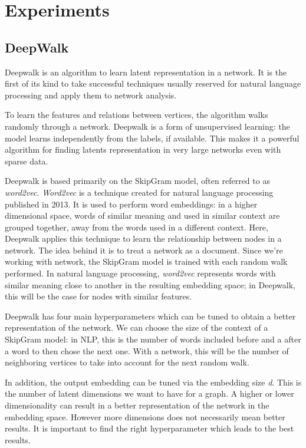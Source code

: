 
\chapter{Experiments} %
\label{cha:Experiments}

\section{DeepWalk}

Deepwalk is an algorithm to learn latent representation in a network.
It is the first of its kind to take successful techniques usually reserved for natural language processing and apply them to network analysis.

To learn the features and relations between vertices, the algorithm walks randomly through a network.
Deepwalk is a form of unsupervised learning: the model learns independently from the labels, if available.
This makes it a powerful algorithm for finding latents representation in very large networks even with sparse data.

Deepwalk is based primarily on the SkipGram model, often referred to as \textit{word2vec}. 
\textit{Word2vec} is a technique created for natural language processing published in 2013.
It is used to perform word embeddings: in a higher dimensional space, words of similar meaning and used in similar context are grouped together, away from the words used in a different context.
Here, Deepwalk applies this technique to learn the relationship between nodes in a network.
The idea behind it is to treat a network as a document.
Since we're working with network, the SkipGram model is trained with each random walk performed.
In natural language processing, \textit{word2vec} represents words with similar meaning close to another in the resulting embedding space; in Deepwalk, this will be the case for nodes with similar features.

Deepwalk has four main hyperparameters which can be tuned to obtain a better representation of the network.
We can choose the size of the context of a SkipGram model: in NLP, this is the number of words included before and a after a word to then chose the next one.
With a network, this will be the number of neighboring vertices to take into account for the next random walk.

In addition, the output embedding can be tuned via the embedding size \textit{d}.
This is the number of latent dimensions we want to have for a graph.
A higher or lower dimensionality can result in a better representation of the network in the embedding space.
However more dimensions does not necessarily mean better results.
It is important to find the right hyperparameter which leads to the best results.

